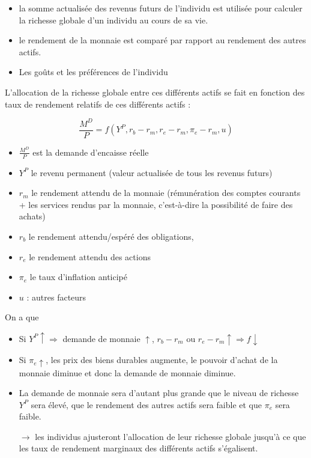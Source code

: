 	\begin{itemize}
		\item la somme actualisée des revenus futurs de l'individu est utilisée pour calculer la richesse globale d'un individu au cours de sa vie.
		\item le rendement de la monnaie est comparé par rapport au rendement des autres actifs.
		\item Les goûts et les préférences de l'individu
	\end{itemize}
	
	L'allocation de la richesse globale entre ces différents actifs se fait en fonction des taux de rendement relatifs de ces différents actifs :
	
	$$\frac{M^D}{P} = f(Y^P, r_b - r_m, r_e - r_m,\pi_e - r_m, u)$$
	
	\begin{itemize}
		\item $\frac{M^D}{P}$ est la demande d'encaisse réelle
		\item  $Y^P$ le revenu permanent (valeur actualisée de tous les revenus futurs)
		\item $r_m$ le rendement attendu de la monnaie (rémunération des comptes courants + les services rendus par la monnaie, c'est-à-dire la possibilité de faire des achats)
		\item $r_b$ le rendement attendu/espéré des obligations,
		\item $r_e$ le rendement attendu des actions
		\item $\pi_e$  le taux d'inflation anticipé
		\item $u$ : autres facteurs
	\end{itemize}
	
	On a que
	
	\begin{itemize}
		\item Si $Y^P \uparrow \Rightarrow$ demande de monnaie $\uparrow$, $r_b - r_m$ ou $r_e - r_m \uparrow \Rightarrow f \downarrow$
		\item Si $\pi_e \uparrow$, les prix des biens durables augmente, le pouvoir d'achat de la monnaie diminue et donc la demande de monnaie diminue.
		
		\item La demande de monnaie sera d'autant plus grande que le niveau de richesse $Y^P$ sera élevé, que le rendement des autres actifs sera faible et que $\pi_e$ sera faible. 
		
		\item[$\rightarrow$] les individus ajusteront l'allocation de leur richesse globale jusqu'à ce que les taux de rendement marginaux des différents actifs s'égalisent.
	\end{itemize}
		
